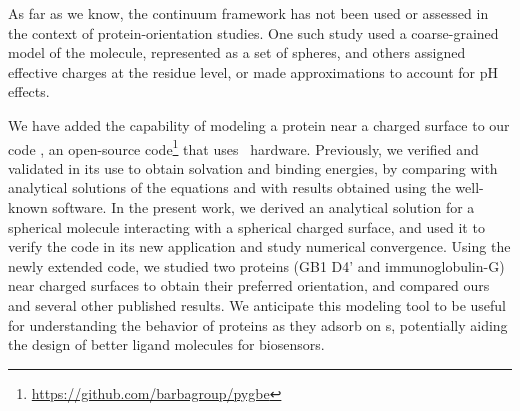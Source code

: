 As far as we know, the continuum framework has not been used or assessed in the context of protein-orientation studies. 
One such study used a coarse-grained model of the molecule, represented as  a set of spheres,\cite{ShengTsaoZhouJiang2002,ZhouTsaoShengJiang2004} and others assigned effective charges at the residue level,\cite{FreedCramer2011,ZhouChenJiang2003} or made approximations to account for pH effects.\cite{BiesheuvelvanderVeenNord2005,HartvigdeWeertOstergaartJorgensenJensen2011}


We have added the capability of modeling a protein near a charged surface to our code \pygbe , an open-source code\footnote{\url{https://github.com/barbagroup/pygbe}}  that uses \gpu\ hardware.  Previously, we verified and validated \pygbe in its use to obtain solvation and binding energies, by comparing with analytical solutions of the equations and with results obtained using the well-known \apbs software.\cite{CooperBarba-share154331,CooperBardhanBarba2013} 
In the present work, we derived an analytical solution for a spherical molecule interacting with a spherical charged surface, and used it to verify the code in its new application and study numerical convergence.
Using the newly extended code, we studied two proteins (GB1 D4' and immunoglobulin-G) near charged surfaces to obtain their preferred orientation, and compared ours and several other published results.
We anticipate this modeling tool to be useful for understanding the behavior of proteins as they adsorb on \sam s, potentially aiding the design of better ligand molecules for biosensors.

